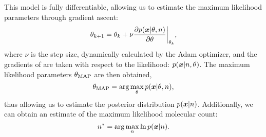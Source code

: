   This model is fully differentiable, allowing us to estimate 
  the maximum likelihood parameters through gradient ascent:
  \begin{align}
    \theta_{k+1} = \theta_{k} + \nu \frac{\partial p(\bm{x} | \theta, n)}{\partial \theta}
    \bigg\rvert_{\theta_{k}}
    \notag
    \text{,}
  \end{align}
  where $\nu$ is the step size, dynamically calculated by the Adam optimizer, and 
  the gradients of \parameters are taken with respect to the likelihood: $p(\bm{x} | n, \theta)$.
  The maximum likelihood parameters $\theta_\text{MAP}$ are then obtained,
  \begin{equation}
    \theta_\text{MAP} = \text{arg}\max_{\theta} p(\bm{x} | \theta, n)
    \text{,}
  \end{equation}
  thus allowing us to estimate the posterior distribution $p(\bm{x}|n)$. 
  Additionally, we can obtain an estimate of the maximum likelihood molecular count:
  \begin{equation}
      n^* =
      \text{arg}\max_{n}
        \ln p(\bm{x} | n)
    \text{.}
    \label{eq:method:optimization}
  \end{equation}
